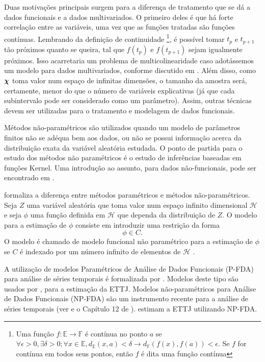 \documentclass[
	12pt,				%
	openright,			%
	oneside,			%
	a4paper,			%
	english,			%
	brazil				%
	]{dissertacao-ufrgs-abntex2}
\begin{document}
Duas motivações principais surgem para a diferença de tratamento que se dá a dados
funcionais e a dados multivariados. O primeiro deles é que há forte
correlação entre as variáveis, uma vez que as funções tratadas são
funções contínuas. Lembrando da definição de continuidade%
\footnote{Uma função $f:\mathbb{E\rightarrow\mathbb{F}}$ é contínua no ponto
$a$ se $\forall\epsilon>0,\exists\delta>0;\forall x\in\mathbb{E},d_{\mathbb{E}}(x,a)<\delta\rightarrow d_{\mathbb{F}}(f(x),f(a))<\epsilon$.
Se $f$ for contínua em todos seus pontos, então $f$ é dita uma função
contínua%
}, é possível tomar $t_{p}$ e $t_{p+1}$ tão próximos quanto se queira,
tal que $f(t_{p})$ e $f(t_{p+1})$ sejam igualmente próximos. Isso
acarretaria um problema de multicolinearidade caso adotássemos um
modelo para dados multivariados, conforme discutido em . Além disso, como $\boldsymbol{\chi}$ toma valor num espaço de infinitas dimensões, o tamanho da amostra será, certamente, menor do que o número de variáveis explicativas (já que cada subintervalo pode ser considerado como um parâmetro). Assim, outras
técnicas devem ser utilizadas para o tratamento e modelagem de dados
funcionais.

Métodos não-paramétricos são utilizados quando um modelo de parâmetros
finitos não se adéqua bem aos dados, ou não se possui informação acerca
da distribuição exata da variável aleatória estudada. O ponto de partida
para o estudo dos métodos não paramétricos é o estudo de inferências
baseadas em funções Kernel. Uma introdução ao assunto, para dados não-funcionais, pode ser encontrado 
em .

 formaliza a diferença entre métodos paramétricos e métodos não-paramétricos.
Seja $Z$ uma variável aleatória que toma valor num espaço infinito
dimensional $\mathcal{H}$ e seja $\phi$ uma função definida em $\mathcal{H}$
que dependa da distribuição de $Z$. O modelo para a estimação de
$\phi$ consiste em introduzir uma restrição da forma
\[
\phi\in C.
\]
O modelo é chamado de modelo funcional não paramétrico para a estimação
de $\phi$ se $C$ é indexado por um número infinito de elementos
de $\mathcal{H}$ .

A utilização de modelos Paramétricos de Análise de Dados Funcionais
(P-FDA) para análise de séries temporais
é formalizada por  .
Modelos deste tipo são usados por ,
 para a estimação da ETTJ.
Modelos não-paramétricos para Análise de Dados Funcionais (NP-FDA) são um instrumento recente para a análise
de séries temporais (ver  e o Capítulo 12 de ).
 estimam a ETTJ utilizando
NP-FDA. %
\end{document}

